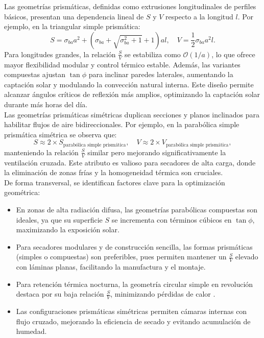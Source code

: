 \documentclass[12pt]{article}
\begin{document}
Las geometrías prismáticas, definidas como extrusiones longitudinales de perfiles básicos, presentan una dependencia lineal de $S$ y $V$ respecto a la longitud $l$. Por ejemplo, en la triangular simple prismática: 
\[
S = \sigma_{ba}a^2 + (\sigma_{ba} + \sqrt{\sigma_{ba}^2+1} + 1)al,\quad V = \frac{1}{2}\sigma_{ba}a^2l.
\]
Para longitudes grandes, la relación $\frac{S}{V}$ se estabiliza como $\mathcal{O}(1/a)$, lo que ofrece mayor flexibilidad modular y control térmico estable. Además, las variantes compuestas ajustan $\tan\phi$ para inclinar paredes laterales, aumentando la captación solar y modulando la convección natural interna. Este diseño permite alcanzar ángulos críticos de reflexión más amplios, optimizando la captación solar durante más horas del día.\\

Las geometrías prismáticas simétricas duplican secciones y planos inclinados para habilitar flujos de aire bidireccionales. Por ejemplo, en la parabólica simple prismática simétrica se observa que:
\[
S \approx 2 \times S_{\text{parabólica simple prismática}}, \quad V \approx 2 \times V_{\text{parabólica simple prismática}},
\]
manteniendo la relación $\frac{S}{V}$ similar pero mejorando significativamente la ventilación cruzada. Este atributo es valioso para secadores de alta carga, donde la eliminación de zonas frías y la homogeneidad térmica son cruciales.\\

De forma transversal, se identifican factores clave para la optimización geométrica:
\begin{itemize}
    \item En zonas de alta radiación difusa, las geometrías parabólicas compuestas son ideales, ya que su superficie $S$ se incrementa con términos cúbicos en $\tan\phi$, maximizando la exposición solar.
    \item Para secadores modulares y de construcción sencilla, las formas prismáticas (simples o compuestas) son preferibles, pues permiten mantener un $\frac{S}{V}$ elevado con láminas planas, facilitando la manufactura y el montaje.
    \item Para retención térmica nocturna, la geometría circular simple en revolución destaca por su baja relación $\frac{S}{V}$, minimizando pérdidas de calor \cite{mustayen2014performance}.
    \item Las configuraciones prismáticas simétricas permiten cámaras internas con flujo cruzado, mejorando la eficiencia de secado y evitando acumulación de humedad.
\end{itemize}
\end{document}
